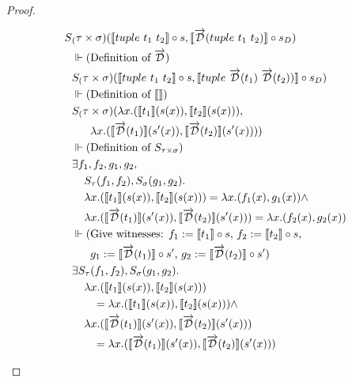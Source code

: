 \documentclass[11pt, final]{article}
\begin{document}
\begin{proof}
\begin{enumerate}
      \begin{align*}
        S&_(\tau \times \sigma)(\llbracket tuple\ t_1\ t_2 \rrbracket \circ s, \llbracket \D(tuple\ t_1\ t_2) \rrbracket \circ s_D) \\
        & \Vdash \text{(Definition of $\D$)} \\
        & S_(\tau \times \sigma)(\llbracket tuple\ t_1\ t_2 \rrbracket \circ s, \llbracket tuple\ \D(t_1)\ \D(t_2)) \rrbracket \circ s_D) \\
        & \Vdash \text{(Definition of $\llbracket\rrbracket$)} \\
        & S_(\tau \times \sigma)(\lambda x. (\llbracket t_1 \rrbracket(s(x)), \llbracket t_2 \rrbracket(s(x))), \\
        & \;\;\;\;\;\;\lambda x. (\llbracket \D(t_1) \rrbracket(s'(x)), \llbracket \D(t_2) \rrbracket(s'(x)))) \\
        & \Vdash \text{(Definition of $S_{\tau\times\sigma}$)} \\
        & \exists f_1, f_2, g_1, g_2, \\
            & \;\;\;\;S_\tau(f_1, f_2), S_\sigma(g_1, g_2). \\
            & \;\;\;\;\lambda x. (\llbracket t_1 \rrbracket(s(x)), \llbracket t_2 \rrbracket(s(x))) = \lambda x. (f_1(x), g_1(x)) \wedge \\
            & \;\;\;\;\lambda x. (\llbracket \D(t_1) \rrbracket(s'(x)), \llbracket \D(t_2) \rrbracket(s'(x))) = \lambda x. (f_2(x), g_2(x)) \\
        & \Vdash \text{(Give witnesses: $f_1 := \llbracket t_1 \rrbracket \circ s$, $f_2 := \llbracket t_2 \rrbracket \circ s$,} \\
        & \;\;\;\;\;\; \text{$g_1 := \llbracket \D(t_1) \rrbracket \circ s'$, $g_2 := \llbracket \D(t_2) \rrbracket \circ s'$)} \\
        & \exists S_\tau(f_1, f_2), S_\sigma(g_1, g_2). \\
          & \;\;\;\;\lambda x. (\llbracket t_1 \rrbracket(s(x)), \llbracket t_2 \rrbracket(s(x))) \\
          & \;\;\;\;\;\;\; = \lambda x. (\llbracket t_1 \rrbracket(s(x)), \llbracket t_2 \rrbracket(s(x))) \wedge \\
          & \;\;\;\;\lambda x. (\llbracket \D(t_1) \rrbracket(s'(x)), \llbracket \D(t_2) \rrbracket(s'(x))) \\
          & \;\;\;\;\;\;\; = \lambda x. (\llbracket \D(t_1) \rrbracket(s'(x)), \llbracket \D(t_2) \rrbracket(s'(x))) \\

\end{align*}
\end{enumerate}
\end{proof}
\end{document}
